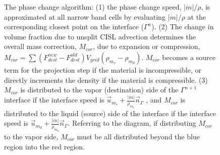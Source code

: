\documentclass[]{article}
\begin{document}
\begin{figure}
\caption{The phase change algorithm: (1) the phase change speed, 
$|\dot{m}|/\rho$, is approximated at all narrow band cells by evaluating
$|\dot{m}|/\rho$ at the corresponding closest point on the interface
($\Gamma^{n}$). (2) The change in volume fraction due to unsplit CISL
advection determines the overall mass correction, $M_{cor}$, due to expansion
or compression, 
$M_{cor}=\sum (F_{dest}^{new}-F_{dest}^{old})V_{grid}(\rho_{m_{s}}-\rho_{m_{d}})$.
$M_{cor}$ becomes a source term 
for the projection
step if the material is incompressible, or directly increments 
the density if the material is compressible.
(3) $M_{cor}$
is distributed to the vapor (destination)
side of the $\Gamma^{n+1}$ interface if the interface speed is 
$\vec{u}_{m_{s}}+\frac{|\dot{m}|}{\rho_{m_{s}}}\vec{n}_{\Gamma}$
, and $M_{cor}$ is
distributed to the liquid (source) side of the interface if the interface
speed is
$\vec{u}_{m_{d}}+\frac{|\dot{m}|}{\rho_{m_{d}}}\vec{n}_{\Gamma}$.
Referring to the diagram, if distributing $M_{cor}$ to the
vapor side, $M_{cor}$ must be all distributed beyond the blue region
into the red region.  \label{mdotproblem} }
\end{figure}
\end{document}
